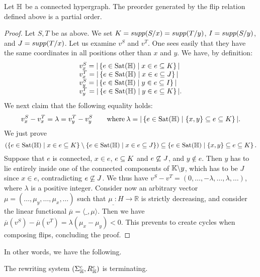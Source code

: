 \begin{proposition} 
\label{flip-partial-order}
Let ${\mathbb H}$ be a connected hypergraph. The preorder generated by the flip relation defined above is a partial order.
\end{proposition}
\begin{proof}
Let $S,T$ be as above. We set $K={supp}(S/x)={supp}(T/y)$, $I={supp}(S/y)$, and $J={supp}(T/x)$.
Let us examine $v^S$ and $v^T$. One sees easily that they have the same coordinates in all positions other than $x$ and  $y$. We have, by definition:
$$\begin{array}{l}
v^S_x  = |\left\{e\in{\operatorname{Sat}}({\mathbb H}) \mid x\in e\subseteq K\right\}|\\
v^T_x  = |\left\{e\in{\operatorname{Sat}}({\mathbb H}) \mid x\in e\subseteq J\right\}|\\ 
v^S_y  = |\left\{e\in{\operatorname{Sat}}({\mathbb H}) \mid y\in e\subseteq I\right\}|\\
v^T_y  = |\left\{e\in{\operatorname{Sat}}({\mathbb H}) \mid y\in e\subseteq K\right\}|.
\end{array}$$
We next claim that the following equality holds:
$$v^S_x  - v^T_x  = \lambda = 
v^T_y - v^S_y \quad\quad\textrm{where}\: \lambda= |\left\{e\in{\operatorname{Sat}}({\mathbb H}) \mid \left\{x,y\right\}\subseteq e\subseteq K\right\}|.$$
We just prove 
$$(\left\{e\in{\operatorname{Sat}}({\mathbb H}) \mid x\in e\subseteq K\right\}\setminus\left\{e\in{\operatorname{Sat}}({\mathbb H}) \mid x\in e\subseteq J\right\})\subseteq\left\{e\in{\operatorname{Sat}}({\mathbb H}) \mid \left\{x,y\right\}\subseteq e\subseteq K\right\}.$$
Suppose that $e$ is connected, $x\in e$, $e\subseteq K$ and $e\not\subseteq J$, and $y\not\in e$. Then $y$ has to lie entirely inside one of the connected components of ${\mathbb K}\backslash y$, which has to be $J$ since $x\in e$, contradicting $e\not\subseteq J$.
We thus have 
$v^S - v^T = (0,\ldots,-\lambda,…,\lambda,\ldots)$, where $\lambda$ is a positive integer.
Consider now an arbitrary vector $\mu=(\ldots,\mu_y,\ldots,\mu_x,\ldots)$ such that $\mu_{\_}:H\rightarrow\mathbb{R}$ is strictly decreasing, and consider the linear functional $\overline{\mu}=\langle\_,\mu\rangle$. 
Then we have 
$\overline{\mu}(v^S)- \overline{\mu}(v^T)=\lambda(\mu_x-\mu_y)<0$. This prevents to create cycles when composing flips, concluding the proof.
\end{proof}

In other words, we have the following.

\begin{thm}
  \label{thm:termination}
  The rewriting system $(\Sigma_{\mathbb H}^c,R_{\mathbb H}^c)$ is terminating.
\end{thm}

